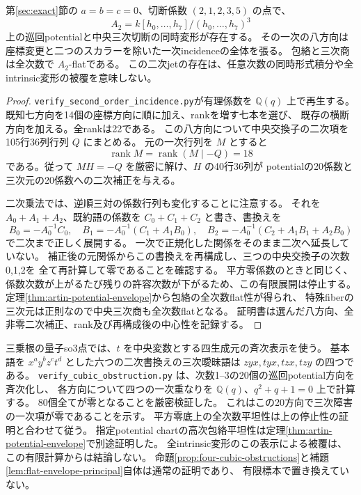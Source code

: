 \begin{proposition}[八方向の同時二次中心切断]
\label{prop:eight-second-order}
第\ref{sec:exact}節の $a=b=c=0$、切断係数 $(2,1,2,3,5)$ の点で、
\[
 A_2=k[h_0,\ldots,h_7]/(h_0,\ldots,h_7)^3
\]
上の巡回potentialと中央三次切断の同時変形が存在する。
その一次の八方向は座標変更と二つのスカラーを除いた一次incidenceの全体を張る。
包絡と三次商は全次数で $A_2$-flatである。
この二次jetの存在は、任意次数の同時形式積分や全intrinsic変形の被覆を意味しない。
\end{proposition}
\begin{proof}
\texttt{verify\_second\_order\_incidence.py}が有理係数を $\mathbb Q(q)$ 上で再生する。
既知七方向を14個の座標方向に順に加え、rankを増す七本を選び、
既存の横断方向を加える。全rankは22である。
この八方向について中央交換子の二次項を105行36列行列 $Q$ にまとめる。
元の一次行列を $M$ とすると
\[
 \operatorname{rank}M=\operatorname{rank}(M\mid-Q)=18
\]
である。従って $MH=-Q$ を厳密に解け、$H$ の40行36列が
potentialの20係数と三次元の20係数への二次補正を与える。

二次乗法では、逆順三対の係数行列も変化することに注意する。
それを $A_0+A_1+A_2$、既約語の係数を $C_0+C_1+C_2$ と書き、書換えを
\[
 B_0=-A_0^{-1}C_0,\quad
 B_1=-A_0^{-1}(C_1+A_1B_0),\quad
 B_2=-A_0^{-1}(C_2+A_1B_1+A_2B_0)
\]
で二次まで正しく展開する。
一次で正規化した関係をそのまま二次へ延長していない。
補正後の元関係からこの書換えを再構成し、三つの中央交換子の次数0,1,2を
全て再計算して零であることを確認する。
平方零係数のときと同じく、係数次数が上がるたび残りの許容次数が下がるため、この有限展開は停止する。
定理\ref{thm:artin-potential-envelope}から包絡の全次数flat性が得られ、
特殊fiberの三次元は正則なので中央三次商も全次数flatとなる。
証明書は選んだ八方向、全非零二次補正、rank及び再構成後の中心性を記録する。
\end{proof}

\begin{remark}[一次の実行済み検証と残る条件]
三乗根の量子so3点では、$t$ を中央変数とする四生成元の斉次表示を使う。
基本語を $x^ay^bz^ct^d$ とした六つの二次書換えの三次曖昧語は
$zyx,tyx,tzx,tzy$ の四つである。
\texttt{verify\_cubic\_obstruction.py} は、次数1--3の20個の巡回potential方向を斉次化し、
各方向について四つの一次重なりを $\mathbb Q(q)$、$q^2+q+1=0$ 上で計算する。
80個全てが零となることを厳密検証した。
これはこの20方向で三次障害の一次項が零であることを示す。
平方零底上の全次数平坦性は上の停止性の証明と合わせて従う。
指定potential chartの高次包絡平坦性は定理\ref{thm:artin-potential-envelope}で別途証明した。
全intrinsic変形のこの表示による被覆は、
この有限計算からは結論しない。
命題\ref{prop:four-cubic-obstructions}と補題\ref{lem:flat-envelope-principal}自体は通常の証明であり、
有限標本で置き換えていない。
\end{remark}
